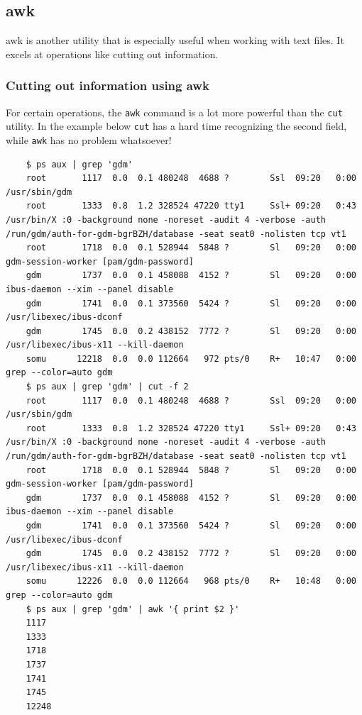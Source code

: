 \documentclass{report}
\begin{document}
	\subsection{awk}
	awk is another utility that is especially useful when working with text files. It excels at operations like cutting out information.

	\subsubsection{Cutting out information using awk}
	For certain operations, the \verb|awk| command is a lot more powerful than the \verb|cut| utility. In the example below \verb|cut| has a hard time recognizing the second field, while \verb|awk| has no problem whatsoever!
	 
	\begin{verbatim}
	$ ps aux | grep 'gdm'
	root       1117  0.0  0.1 480248  4688 ?        Ssl  09:20   0:00 /usr/sbin/gdm
	root       1333  0.8  1.2 328524 47220 tty1     Ssl+ 09:20   0:43 /usr/bin/X :0 -background none -noreset -audit 4 -verbose -auth /run/gdm/auth-for-gdm-bgrBZH/database -seat seat0 -nolisten tcp vt1
	root       1718  0.0  0.1 528944  5848 ?        Sl   09:20   0:00 gdm-session-worker [pam/gdm-password]
	gdm        1737  0.0  0.1 458088  4152 ?        Sl   09:20   0:00 ibus-daemon --xim --panel disable
	gdm        1741  0.0  0.1 373560  5424 ?        Sl   09:20   0:00 /usr/libexec/ibus-dconf
	gdm        1745  0.0  0.2 438152  7772 ?        Sl   09:20   0:00 /usr/libexec/ibus-x11 --kill-daemon
	somu      12218  0.0  0.0 112664   972 pts/0    R+   10:47   0:00 grep --color=auto gdm
	$ ps aux | grep 'gdm' | cut -f 2
	root       1117  0.0  0.1 480248  4688 ?        Ssl  09:20   0:00 /usr/sbin/gdm
	root       1333  0.8  1.2 328524 47220 tty1     Ssl+ 09:20   0:43 /usr/bin/X :0 -background none -noreset -audit 4 -verbose -auth /run/gdm/auth-for-gdm-bgrBZH/database -seat seat0 -nolisten tcp vt1
	root       1718  0.0  0.1 528944  5848 ?        Sl   09:20   0:00 gdm-session-worker [pam/gdm-password]
	gdm        1737  0.0  0.1 458088  4152 ?        Sl   09:20   0:00 ibus-daemon --xim --panel disable
	gdm        1741  0.0  0.1 373560  5424 ?        Sl   09:20   0:00 /usr/libexec/ibus-dconf
	gdm        1745  0.0  0.2 438152  7772 ?        Sl   09:20   0:00 /usr/libexec/ibus-x11 --kill-daemon
	somu      12226  0.0  0.0 112664   968 pts/0    R+   10:48   0:00 grep --color=auto gdm
	$ ps aux | grep 'gdm' | awk '{ print $2 }'
	1117
	1333
	1718
	1737
	1741
	1745
	12248
	\end{verbatim}
	
\end{document}

